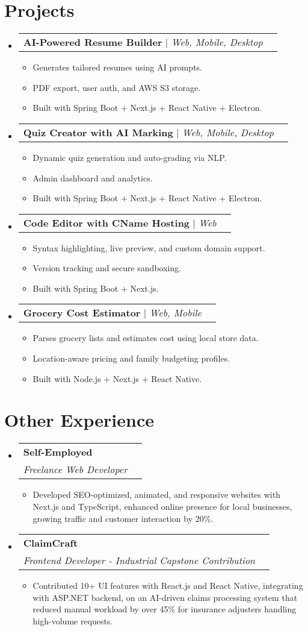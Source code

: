 \documentclass[letterpaper,11pt]{article}
\makeatletter
\newcommand{\resumeItem}[1]{
\item\small{
{#1 \vspace{-2pt}}
}
}
\newcommand{\resumeSubheading}[4]{
\vspace{-2pt}\item
\begin{tabular*}{0.97\textwidth}[t]{l@{\extracolsep{\fill}}r}
\textbf{#1} & #2 \\
\textit{\small#3} & \textit{\small #4} \\
\end{tabular*}\vspace{-7pt}
}
\newcommand{\resumeProjectHeading}[2]{
\item
\begin{tabular*}{0.97\textwidth}{l@{\extracolsep{\fill}}r}
\small#1 & #2 \\
\end{tabular*}\vspace{-7pt}
}
\newcommand{\resumeSubHeadingListStart}{\begin{itemize}[leftmargin=0.15in, label={}]}
\newcommand{\resumeSubHeadingListEnd}{\end{itemize}}
\newcommand{\resumeItemListStart}{\begin{itemize}}
\newcommand{\resumeItemListEnd}{\end{itemize}\vspace{-5pt}}
\makeatother
\begin{document}
\section{Projects}
\resumeSubHeadingListStart
\resumeProjectHeading{\textbf{AI-Powered Resume Builder} $|$ \emph{Web, Mobile, Desktop}}{}
\resumeItemListStart
\resumeItem{Generates tailored resumes using AI prompts.}
\resumeItem{PDF export, user auth, and AWS S3 storage.}
\resumeItem{Built with Spring Boot + Next.js + React Native + Electron.}
\resumeItemListEnd

\resumeProjectHeading{\textbf{Quiz Creator with AI Marking} $|$ \emph{Web, Mobile, Desktop}}{}
\resumeItemListStart
\resumeItem{Dynamic quiz generation and auto-grading via NLP.}
\resumeItem{Admin dashboard and analytics.}
\resumeItem{Built with Spring Boot + Next.js + React Native + Electron.}
\resumeItemListEnd

\resumeProjectHeading{\textbf{Code Editor with CName Hosting} $|$ \emph{Web}}{}
\resumeItemListStart
\resumeItem{Syntax highlighting, live preview, and custom domain support.}
\resumeItem{Version tracking and secure sandboxing.}
\resumeItem{Built with Spring Boot + Next.js.}
\resumeItemListEnd

\resumeProjectHeading{\textbf{Grocery Cost Estimator} $|$ \emph{Web, Mobile}}{}
\resumeItemListStart
\resumeItem{Parses grocery lists and estimates cost using local store data.}
\resumeItem{Location-aware pricing and family budgeting profiles.}
\resumeItem{Built with Node.js + Next.js + React Native.}
\resumeItemListEnd
\resumeSubHeadingListEnd

\section{Other Experience}
\resumeSubHeadingListStart
\resumeSubheading{Self-Employed}{}{Freelance Web Developer}{}
\resumeItemListStart
\resumeItem{Developed SEO-optimized, animated, and responsive websites with Next.js and TypeScript, enhanced online presence for local businesses, growing traffic and customer interaction by 20\%.}
\resumeItemListEnd
\resumeSubheading{ClaimCraft}{}{Frontend Developer - Industrial Capstone Contribution}{}
\resumeItemListStart
\resumeItem{Contributed 10+ UI features with React.js and React Native, integrating with ASP.NET backend, on an AI-driven claims processing system that reduced manual workload by over 45\% for insurance adjusters handling high-volume requests.}
\resumeItemListEnd
\resumeSubHeadingListEnd
\end{document}
